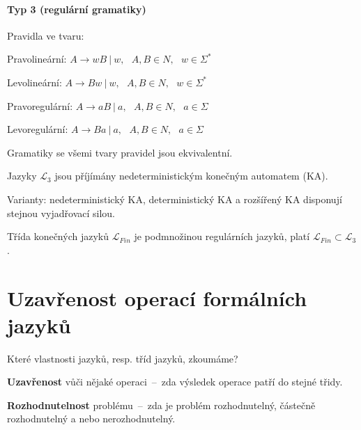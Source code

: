 \paragraph*{Typ 3 (regulární gramatiky)} \begin{compactitem}
    \item Pravidla ve tvaru: \begin{compactitem}
        \item Pravolineární: $A \rightarrow wB~|~w,~~~ A,B \in N,~~~ w \in \Sigma^*$

        \item Levolineární: $A \rightarrow Bw~|~w,~~~ A,B \in N,~~~ w \in \Sigma^*$

        \item Pravoregulární: $A \rightarrow aB~|~a,~~~ A,B \in N,~~~ a \in \Sigma$

        \item Levoregulární: $A \rightarrow Ba~|~a,~~~ A,B \in N,~~~ a \in \Sigma$
    \end{compactitem}

    \item Gramatiky se všemi tvary pravidel jsou ekvivalentní.

    \item Jazyky $\mathcal{L}_3$ jsou příjímány nedeterministickým konečným automatem (KA). \begin{compactitem}
        \item Varianty: nedeterministický KA, deterministický KA a rozšířený KA disponují stejnou vyjadřovací silou.
    \end{compactitem}

    \item Třída konečných jazyků $\mathcal{L}_{Fin}$ je podmnožinou regulárních jazyků, platí $\mathcal{L}_{Fin} \subset \mathcal{L}_3$.
\end{compactitem}


\section{Uzavřenost operací formálních jazyků}

\begin{compactitem}
    \item Které vlastnosti jazyků, resp. tříd jazyků, zkoumáme? \begin{compactitem}
        \item \textbf{Uzavřenost} vůči nějaké operaci~--~zda výsledek operace patří do stejné třidy.

        \item \textbf{Rozhodnutelnost} problému~--~zda je problém rozhodnutelný, částečně rozhodnutelný a nebo nerozhodnutelný.
    \end{compactitem}
\end{compactitem}

